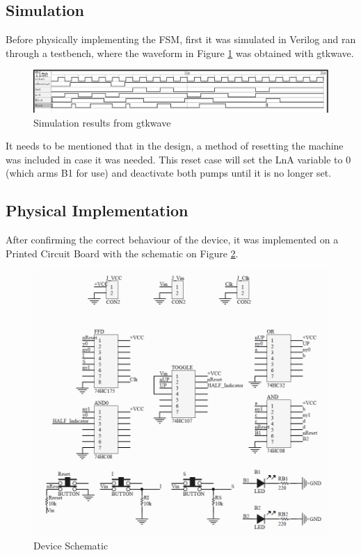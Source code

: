\subsection{Simulation}

Before physically implementing the FSM, first it was simulated in Verilog and ran through a testbench, 
where the waveform in Figure \ref{fig:moore_gtk} was obtained with gtkwave.

\begin{figure}
    \begin{center}
        \includegraphics[width=\linewidth]{gtkwave.png}
        \caption{Simulation results from gtkwave}
        \label{fig:moore_gtk}
    \end{center}
\end{figure}

It needs to be mentioned that in the design, a method of resetting the machine was included in case it was needed.
This reset case will set the LnA variable to 0 (which arms B1 for use) and deactivate both pumps until it is no longer
set.

\subsection{Physical Implementation}

After confirming the correct behaviour of the device, it was implemented on a Printed Circuit Board with the schematic
on Figure \ref{fig:moore_schem}.

\begin{figure}[ht]
    \begin{center}
        \includegraphics[width=\linewidth]{schematic.png}
        \caption{Device Schematic}
        \label{fig:moore_schem}
    \end{center}
\end{figure}

